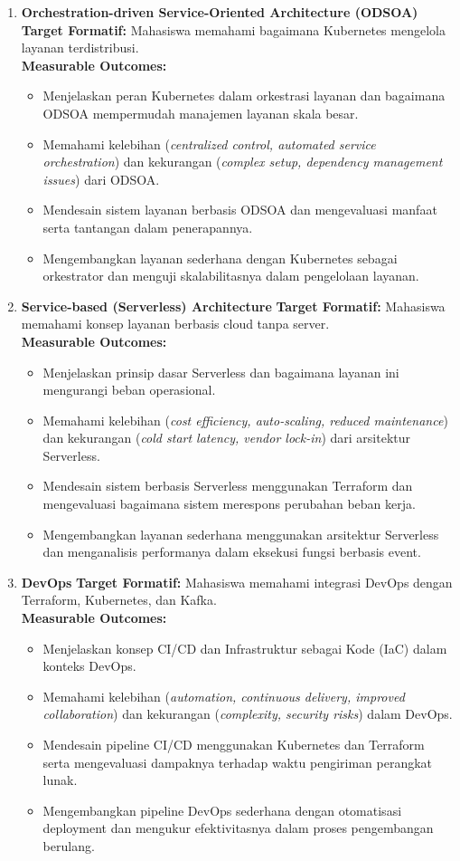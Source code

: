 \begin{enumerate}
\item \textbf{Orchestration-driven Service-Oriented Architecture (ODSOA)}  
\textbf{Target Formatif:} Mahasiswa memahami bagaimana Kubernetes mengelola layanan terdistribusi.  \\
\textbf{Measurable Outcomes:}
\begin{itemize}
\item Menjelaskan peran Kubernetes dalam orkestrasi layanan dan bagaimana ODSOA mempermudah manajemen layanan skala besar.
\item Memahami kelebihan (\textit{centralized control, automated service orchestration}) dan kekurangan (\textit{complex setup, dependency management issues}) dari ODSOA.
\item Mendesain sistem layanan berbasis ODSOA dan mengevaluasi manfaat serta tantangan dalam penerapannya.
\item Mengembangkan layanan sederhana dengan Kubernetes sebagai orkestrator dan menguji skalabilitasnya dalam pengelolaan layanan.
\end{itemize}

\item \textbf{Service-based (Serverless) Architecture}  
\textbf{Target Formatif:} Mahasiswa memahami konsep layanan berbasis cloud tanpa server.  \\
\textbf{Measurable Outcomes:}
\begin{itemize}
\item Menjelaskan prinsip dasar Serverless dan bagaimana layanan ini mengurangi beban operasional.
\item Memahami kelebihan (\textit{cost efficiency, auto-scaling, reduced maintenance}) dan kekurangan (\textit{cold start latency, vendor lock-in}) dari arsitektur Serverless.
\item Mendesain sistem berbasis Serverless menggunakan Terraform dan mengevaluasi bagaimana sistem merespons perubahan beban kerja.
\item Mengembangkan layanan sederhana menggunakan arsitektur Serverless dan menganalisis performanya dalam eksekusi fungsi berbasis event.
\end{itemize}

\item \textbf{DevOps}  
\textbf{Target Formatif:} Mahasiswa memahami integrasi DevOps dengan Terraform, Kubernetes, dan Kafka.  \\
\textbf{Measurable Outcomes:}
\begin{itemize}
\item Menjelaskan konsep CI/CD dan Infrastruktur sebagai Kode (IaC) dalam konteks DevOps.
\item Memahami kelebihan (\textit{automation, continuous delivery, improved collaboration}) dan kekurangan (\textit{complexity, security risks}) dalam DevOps.
\item Mendesain pipeline CI/CD menggunakan Kubernetes dan Terraform serta mengevaluasi dampaknya terhadap waktu pengiriman perangkat lunak.
\item Mengembangkan pipeline DevOps sederhana dengan otomatisasi deployment dan mengukur efektivitasnya dalam proses pengembangan berulang.
\end{itemize}


\end{enumerate}
